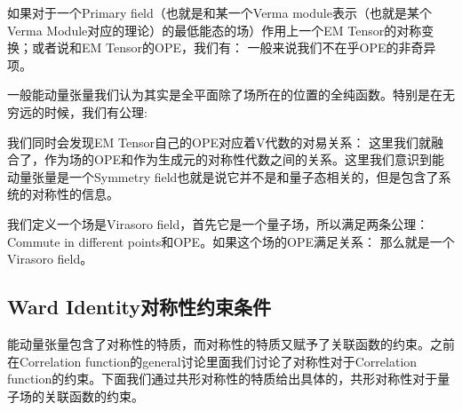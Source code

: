 如果对于一个Primary field（也就是和某一个Verma module表示（也就是某个Verma Module对应的理论）的最低能态的场）作用上一个EM Tensor的对称变换；或者说和EM Tensor的OPE，我们有：
一般来说我们不在乎OPE的非奇异项。

一般能动量张量我们认为其实是全平面除了场所在的位置的全纯函数。特别是在无穷远的时候，我们有公理:


我们同时会发现EM Tensor自己的OPE对应着V代数的对易关系：
这里我们就融合了，作为场的OPE和作为生成元的对称性代数之间的关系。这里我们意识到能动量张量是一个Symmetry field也就是说它并不是和量子态相关的，但是包含了系统的对称性的信息。

我们定义一个场是Virasoro field，首先它是一个量子场，所以满足两条公理：Commute in different points和OPE。如果这个场的OPE满足关系：
那么就是一个Virasoro field。

\subsection{Ward Identity对称性约束条件}
能动量张量包含了对称性的特质，而对称性的特质又赋予了关联函数的约束。之前在Correlation function的general讨论里面我们讨论了对称性对于Correlation function的约束。下面我们通过共形对称性的特质给出具体的，共形对称性对于量子场的关联函数的约束。

